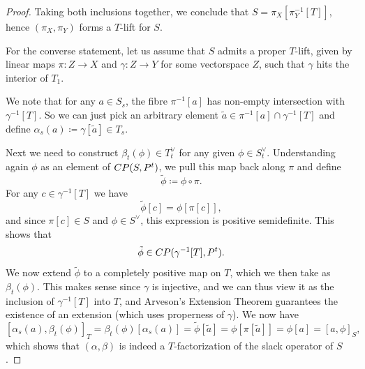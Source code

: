 \documentclass[10pt,a4paper]{amsart}
\begin{document}
\begin{proof}
	Taking both inclusions together, we conclude that \(S = \pi_X[\pi_Y^{-1}[T]]\), hence \((\pi_X, \pi_Y)\) forms a \(T\)-lift for \(S\).
	
	For the converse statement, let us assume that \(S\) admits a proper \(T\)-lift, given by  linear maps \(\pi\colon Z \to X\) and \(\gamma\colon Z \to Y\) for some vectorspace \(Z\), such that $\gamma$ hits the interior of $T_1$. 
	
	We note that for any \(a \in S_s\), the fibre \(\pi^{-1}[a]\) has non-empty intersection with \(\gamma^{-1}[T]\). So we can just pick an arbitrary  element \(\tilde{a} \in \pi^{-1}[a] \cap \gamma^{-1}[T]\) and define \(\alpha_s(a) \coloneqq \gamma[\tilde{a}]\in T_s.\)
	
	Next we need to construct \(\beta_t(\phi)\in T^\vee_t\) for any given \(\phi \in S^\lor_t\). Understanding again \(\phi\) as an element of \({\rm CP}(S, P^t)\), we pull this map back along \(\pi\) and define \[\tilde{\phi} \coloneqq \phi \circ \pi.\] For any \(c \in \gamma^{-1}[T]\) we have \[\tilde{\phi}[c] = \phi[\pi[c]],\] and since \(\pi[c] \in S\) and \(\phi \in S^\lor\), this expression is positive semidefinite. This shows that \[\tilde{\phi} \in {\rm CP}(\gamma^{-1}[T], P^t).\]
	We now  extend \(\tilde{\phi}\) to a completely positive map on \(T\), which we then take as \(\beta_t(\phi)\). This  makes sense since \(\gamma\) is injective, and we can thus view it as the inclusion of \(\gamma^{-1}[T]\) into \(T\), and  Arveson's Extension Theorem guarantees the existence of an extension (which uses properness of $\gamma$).   We now have  \[[\alpha_s(a),\beta_t(\phi)]_T=\beta_t(\phi)[\alpha_s(a)] = \tilde{\phi}[\tilde{a}] = \phi[\pi[\tilde{a}]] = \phi[a]=[a,\phi]_S,\] which shows that \((\alpha, \beta)\) is indeed a \(T\)-factorization of the slack operator of \(S\). 
\end{proof}
\end{document}
